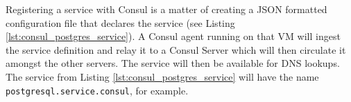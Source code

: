 Registering a service with Consul is a matter of creating a JSON formatted configuration file that declares the service (see Listing \ref{lst:consul_postgres_service}). A Consul agent running on that VM will ingest the service definition and relay it to a Consul Server which will then circulate it amongst the other servers. The service will then be available for DNS lookups. The service from Listing \ref{lst:consul_postgres_service} will have the name \texttt{postgresql.service.consul}, for example.



	